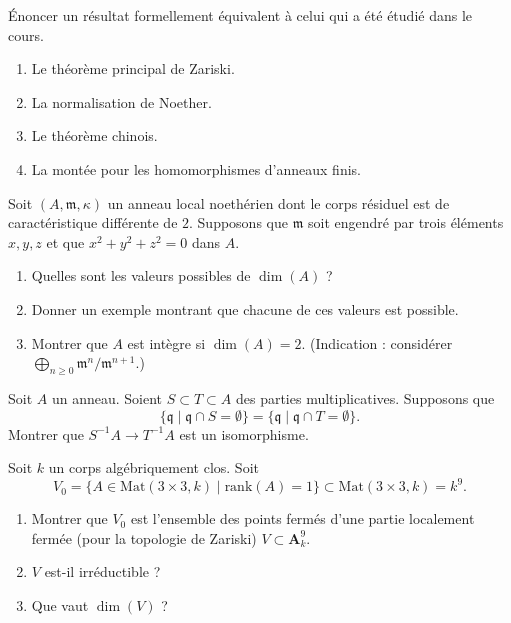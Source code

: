 \begin{exercise}[Résultats]
\label{exercise-results-fall-2011}
Énoncer un résultat formellement équivalent à celui qui a été étudié
dans le cours.
\begin{enumerate}
\item Le théorème principal de Zariski.
\item La normalisation de Noether.
\item Le théorème chinois.
\item La montée pour les homomorphismes d'anneaux finis.
\end{enumerate}
\end{exercise}

\begin{exercise}
\label{exercise-dimension-of-ring}
Soit $(A, \mathfrak m, \kappa)$ un anneau local noethérien
dont le corps résiduel est de caractéristique différente de $2$.
Supposons que $\mathfrak m$ soit engendré par trois éléments
$x, y, z$ et que $x^2 + y^2 + z^2 = 0$ dans $A$.
\begin{enumerate}
\item Quelles sont les valeurs possibles de $\dim(A)$ ?
\item Donner un exemple montrant que chacune de ces valeurs est possible.
\item Montrer que $A$ est intègre si $\dim(A) = 2$.
(Indication : considérer
$\bigoplus_{n \geq 0} \mathfrak m^n/\mathfrak m^{n + 1}$.)
\end{enumerate}
\end{exercise}

\begin{exercise}
\label{exercise-localization}
Soit $A$ un anneau.
Soient $S \subset T \subset A$ des parties multiplicatives.
Supposons que
$$
\{\mathfrak q \mid \mathfrak q \cap S = \emptyset\} =
\{\mathfrak q \mid \mathfrak q \cap T = \emptyset\}.
$$
Montrer que $S^{-1}A \to T^{-1}A$ est un isomorphisme.
\end{exercise}

\begin{exercise}
\label{exercise-locus-of-rank-1}
Soit $k$ un corps algébriquement clos. Soit
$$
V_0 = \{ A \in \text{Mat}(3 \times 3, k) \mid \text{rank}(A) = 1\}
\subset \text{Mat}(3 \times 3, k) = k^9.
$$
\begin{enumerate}
\item Montrer que $V_0$ est l'ensemble des points fermés d'une
partie localement fermée (pour la topologie de Zariski) $V \subset \mathbf{A}^9_k$.
\item $V$ est-il irréductible ?
\item Que vaut $\dim(V)$ ?
\end{enumerate}
\end{exercise}

